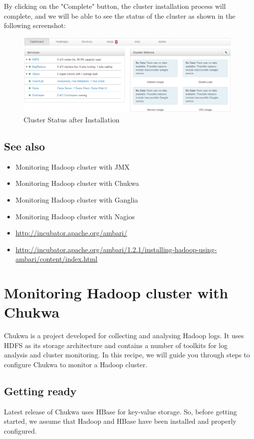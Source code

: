 By clicking on the "Complete" button, the cluster installation process will complete, and we will be able to see the status of the cluster as shown in the following screenshot:
\begin{figure}[ht]
  \centering
  \includegraphics[width=.8\textwidth]{figs/5163os_06_27.png}
  \caption{Cluster Status after Installation}\label{fig:cluster.status}
\end{figure} 
\subsection*{See also}
\begin{itemize}
  \item Monitoring Hadoop cluster with JMX
  \item Monitoring Hadoop cluster with Chukwa 
  \item Monitoring Hadoop cluster with Ganglia
  \item Monitoring Hadoop cluster with Nagios
  \item \url{http://incubator.apache.org/ambari/}
  \item \url{http://incubator.apache.org/ambari/1.2.1/installing-hadoop-using-ambari/content/index.html}
\end{itemize}

\section{Monitoring Hadoop cluster with Chukwa}
Chukwa is a project developed for collecting and analysing Hadoop logs. It uses HDFS as its storage architecture and contains a number of toolkits for log analysis and cluster monitoring. In this recipe, we will guide you through steps to configure Chukwa to monitor a Hadoop cluster.
\subsection*{Getting ready}
Latest release of Chukwa uses HBase for key-value storage. So, before getting started, we assume that Hadoop and HBase have been installed and properly configured.

